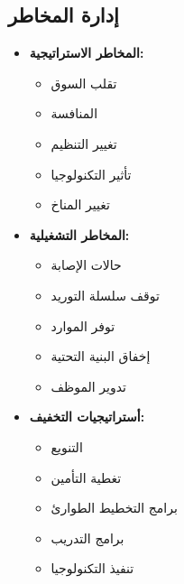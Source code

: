 \subsection{إدارة المخاطر}
\begin{itemize}
    \item \textbf{المخاطر الاستراتيجية:}
    \begin{itemize}
        \item تقلب السوق
        \item المنافسة
        \item تغيير التنظيم
        \item تأثير التكنولوجيا
        \item تغيير المناخ
    \end{itemize}
    
    \item \textbf{المخاطر التشغيلية:}
    \begin{itemize}
        \item حالات الإصابة
        \item توقف سلسلة التوريد
        \item توفر الموارد
        \item إخفاق البنية التحتية
        \item تدوير الموظف
    \end{itemize}
    
    \item \textbf{أستراتيجيات التخفيف:}
    \begin{itemize}
        \item التنويع
        \item تغطية التأمين
        \item برامج التخطيط الطوارئ
        \item برامج التدريب
        \item تنفيذ التكنولوجيا
    \end{itemize}
\end{itemize}
